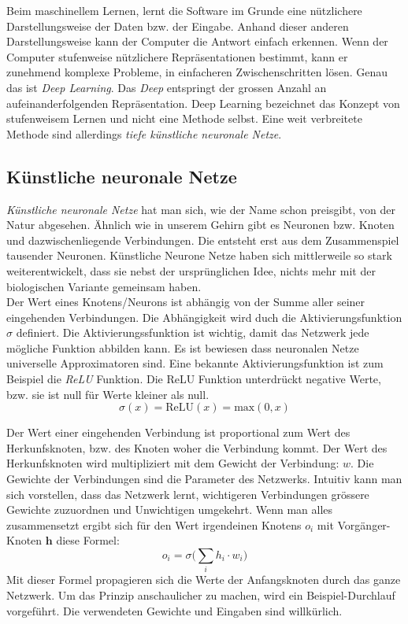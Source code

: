 Beim maschinellem Lernen, lernt die Software im Grunde eine nützlichere Darstellungsweise der Daten bzw. der Eingabe. Anhand dieser anderen Darstellungsweise kann der Computer die Antwort einfach erkennen. Wenn der Computer stufenweise nützlichere Repräsentationen bestimmt, kann er zunehmend komplexe Probleme, in einfacheren Zwischenschritten lösen. Genau das ist \textit{Deep Learning}. Das \textit{Deep} entspringt der grossen Anzahl an aufeinanderfolgenden Repräsentation. Deep Learning bezeichnet das Konzept von stufenweisem Lernen und nicht eine Methode selbst. Eine weit verbreitete Methode sind allerdings \textit{tiefe künstliche neuronale Netze}.\parencite[vgl.][]{chollet} 

\subsection{Künstliche neuronale Netze}

\textit{Künstliche neuronale Netze} hat man sich, wie der Name schon preisgibt, von der Natur abgesehen. Ähnlich wie in unserem Gehirn gibt es Neuronen bzw. Knoten und dazwischenliegende Verbindungen. Die  entsteht erst aus dem Zusammenspiel tausender Neuronen. Künstliche Neurone Netze haben sich mittlerweile so stark weiterentwickelt, dass sie nebst der ursprünglichen Idee, nichts mehr mit der biologischen Variante gemeinsam haben. \\

Der Wert eines Knotens/Neurons ist abhängig von der Summe aller seiner eingehenden Verbindungen. Die Abhängigkeit wird duch die Aktivierungsfunktion $\sigma$ definiert. Die Aktivierungssfunktion ist wichtig, damit das Netzwerk jede mögliche Funktion abbilden kann. Es ist bewiesen dass neuronalen Netze universelle Approximatoren sind\parencite[][Kap. 4]{universal}. Eine bekannte Aktivierungsfunktion ist zum Beispiel die \textit{ReLU} Funktion. Die ReLU Funktion unterdrückt negative Werte, bzw. sie ist null für Werte kleiner als null.   \parencite{neuronale_netze} 
$$\sigma(x) = \text{ReLU}(x) = \text{max}(0, x)$$

Der Wert einer eingehenden Verbindung ist proportional zum Wert des Herkunfsknoten, bzw. des Knoten woher die Verbindung kommt. Der Wert des Herkunfsknoten wird multipliziert mit dem Gewicht der Verbindung: $w$. Die Gewichte der Verbindungen sind die Parameter des Netzwerks. Intuitiv kann man sich vorstellen, dass das Netzwerk lernt, wichtigeren Verbindungen grössere Gewichte zuzuordnen und Unwichtigen umgekehrt. Wenn man alles zusammensetzt ergibt sich für den Wert irgendeinen Knotens $o_i$ mit Vorgänger-Knoten $\boldsymbol{h}$ diese Formel:
$$ o_i = \sigma\Big(\sum_i h_i \cdot w_{i}\Big)$$
Mit dieser Formel propagieren sich die Werte der Anfangsknoten durch das ganze Netzwerk. Um das Prinzip anschaulicher zu machen, wird ein Beispiel-Durchlauf vorgeführt. Die verwendeten Gewichte und Eingaben sind willkürlich.

